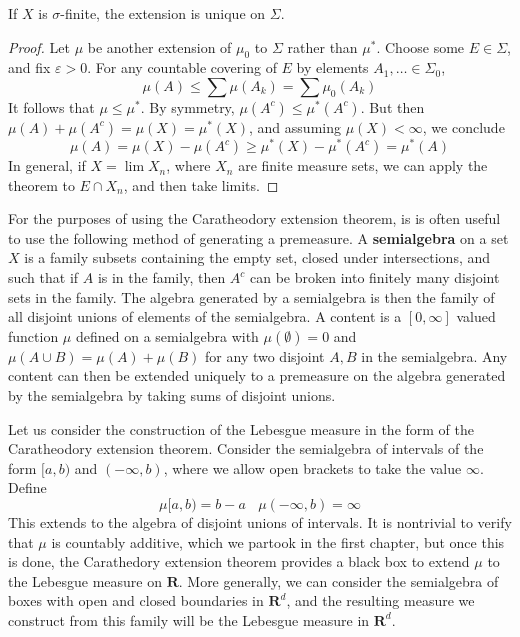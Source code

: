 \begin{corollary}
    If $X$ is $\sigma$-finite, the extension is unique on $\Sigma$.
\end{corollary}
\begin{proof}
    Let $\mu$ be another extension of $\mu_0$ to $\Sigma$ rather than $\mu^*$. Choose some $E \in \Sigma$, and fix $\varepsilon > 0$. For any countable covering of $E$ by elements $A_1, \dots \in \Sigma_0$,
    \[ \mu(A) \leq \sum \mu(A_k) = \sum \mu_0(A_k) \]
    It follows that $\mu \leq \mu^*$. By symmetry, $\mu(A^c) \leq \mu^*(A^c)$. But then $\mu(A) + \mu(A^c) = \mu(X) = \mu^*(X)$, and assuming $\mu(X) < \infty$, we conclude
    \[ \mu(A) = \mu(X) - \mu(A^c) \geq \mu^*(X) - \mu^*(A^c) = \mu^*(A) \]
    In general, if $X = \lim X_n$, where $X_n$ are finite measure sets, we can apply the theorem to $E \cap X_n$, and then take limits.
\end{proof}


For the purposes of using the Caratheodory extension theorem, is is often useful to use the following method of generating a premeasure. A {\bf semialgebra} on a set $X$ is a family subsets containing the empty set, closed under intersections, and such that if $A$ is in the family, then $A^c$ can be broken into finitely many disjoint sets in the family. The algebra generated by a semialgebra is then the family of all disjoint unions of elements of the semialgebra. A content is a $[0,\infty]$ valued function $\mu$ defined on a semialgebra with $\mu(\emptyset) = 0$ and $\mu(A \cup B) = \mu(A) + \mu(B)$ for any two disjoint $A,B$ in the semialgebra. Any content can then be extended uniquely to a premeasure on the algebra generated by the semialgebra by taking sums of disjoint unions.

\begin{example}
    Let us consider the construction of the Lebesgue measure in the form of the Caratheodory extension theorem. Consider the semialgebra of intervals of the form $[a,b)$ and $(-\infty,b)$, where we allow open brackets to take the value $\infty$. Define
    \[ \mu [a,b) = b-a\ \ \ \ \mu(-\infty,b) = \infty \]
    This extends to the algebra of disjoint unions of intervals. It is nontrivial to verify that $\mu$ is countably additive, which we partook in the first chapter, but once this is done, the Carathedory extension theorem provides a black box to extend $\mu$ to the Lebesgue measure on $\mathbf{R}$. More generally, we can consider the semialgebra of boxes with open and closed boundaries in $\mathbf{R}^d$, and the resulting measure we construct from this family will be the Lebesgue measure in $\mathbf{R}^d$.
\end{example}

